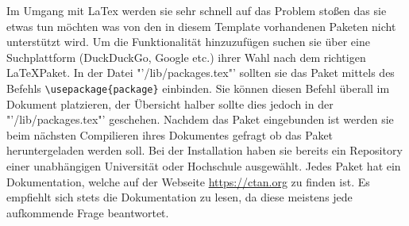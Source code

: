 Im Umgang mit LaTex werden sie sehr schnell auf das Problem stoßen das sie etwas tun möchten was von den in diesem Template vorhandenen Paketen nicht unterstützt wird. Um die Funktionalität hinzuzufügen suchen sie über eine Suchplattform (DuckDuckGo, Google etc.) ihrer Wahl nach dem richtigen \LaTeX Paket. In der Datei "'/lib/packages.tex"' sollten sie das Paket mittels des Befehls \verb|\usepackage{package}| einbinden. Sie können diesen Befehl überall im Dokument platzieren, der Übersicht halber sollte dies jedoch in der "'/lib/packages.tex"' geschehen. Nachdem das Paket eingebunden ist werden sie beim nächsten Compilieren ihres Dokumentes gefragt ob das Paket heruntergeladen werden soll. Bei der Installation haben sie bereits ein Repository einer unabhängigen Universität oder Hochschule ausgewählt. Jedes Paket hat ein Dokumentation, welche auf der Webseite \url{https://ctan.org} zu finden ist. Es empfiehlt sich stets die Dokumentation zu lesen, da diese meistens jede aufkommende Frage beantwortet. 